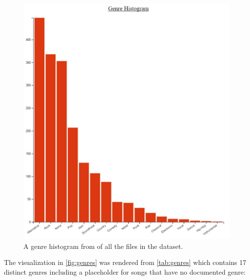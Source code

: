 \documentclass[journal]{vgtc}                %
\begin{document}
\begin{figure}[h]
 \centering %
 \includegraphics[width=\columnwidth]{genre-histogram}
 \caption{A genre histogram from \cite{Grifski:2019} of all the files in the dataset.}
 \label{fig:genres}
\end{figure}

The visualization in \autoref{fig:genres} was rendered from \autoref{tab:genres}
which contains 17 distinct genres including a placeholder for songs that have
no documented genre:
\end{document}
